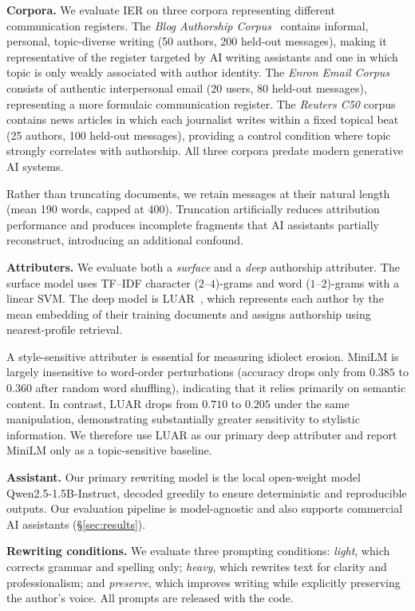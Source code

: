 \documentclass[sigconf,nonacm]{acmart}
\begin{document}
\textbf{Corpora.}
We evaluate IER on three corpora representing different communication registers.
The \emph{Blog Authorship Corpus}~\cite{schler2006} contains informal, personal,
topic-diverse writing (50 authors, 200 held-out messages), making it representative
of the register targeted by AI writing assistants and one in which topic is only
weakly associated with author identity. The \emph{Enron Email Corpus} consists of
authentic interpersonal email (20 users, 80 held-out messages), representing a more
formulaic communication register. The \emph{Reuters C50} corpus contains news
articles in which each journalist writes within a fixed topical beat (25 authors,
100 held-out messages), providing a control condition where topic strongly
correlates with authorship. All three corpora predate modern generative AI systems.

Rather than truncating documents, we retain messages at their natural length (mean
190 words, capped at 400). Truncation artificially reduces attribution performance
and produces incomplete fragments that AI assistants partially reconstruct,
introducing an additional confound.

\textbf{Attributers.}
We evaluate both a \emph{surface} and a \emph{deep} authorship attributer. The
surface model uses TF--IDF character ($2$--$4$)-grams and word ($1$--$2$)-grams with
a linear SVM. The deep model is LUAR~\cite{luar2021}, which represents each author
by the mean embedding of their training documents and assigns authorship using
nearest-profile retrieval.

A style-sensitive attributer is essential for measuring idiolect erosion. MiniLM is
largely insensitive to word-order perturbations (accuracy drops only from $0.385$ to
$0.360$ after random word shuffling), indicating that it relies primarily on
semantic content. In contrast, LUAR drops from $0.710$ to $0.205$ under the same
manipulation, demonstrating substantially greater sensitivity to stylistic
information. We therefore use LUAR as our primary deep attributer and report MiniLM
only as a topic-sensitive baseline.

\textbf{Assistant.}
Our primary rewriting model is the local open-weight model Qwen2.5-1.5B-Instruct,
decoded greedily to ensure deterministic and reproducible outputs. Our evaluation
pipeline is model-agnostic and also supports commercial AI assistants
(\S\ref{sec:results}).

\textbf{Rewriting conditions.}
We evaluate three prompting conditions: \emph{light}, which corrects grammar and
spelling only; \emph{heavy}, which rewrites text for clarity and professionalism;
and \emph{preserve}, which improves writing while explicitly preserving the
author's voice. All prompts are released with the code.
\end{document}
